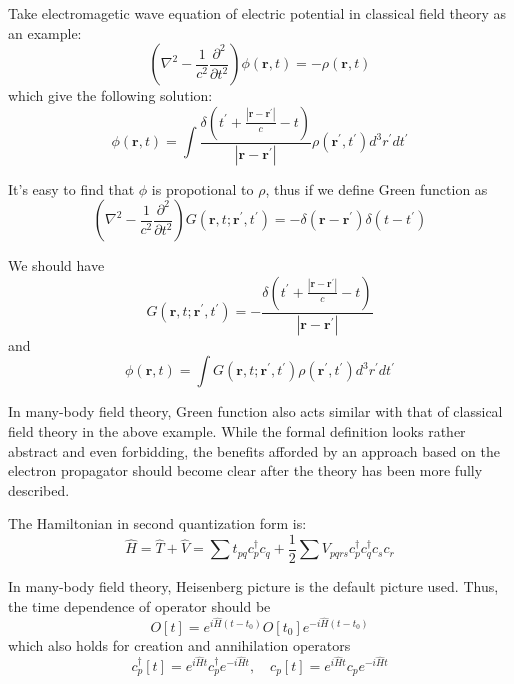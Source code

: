 Take electromagetic wave equation of electric potential in classical field theory as an example:
\begin{equation}
\left(\nabla^{2}-\frac{1}{c^2}\frac{\partial^{2}}{\partial t^{2}}\right) \phi(\mathbf{r},t)=-\rho(\mathbf{r},t)
\end{equation}
which give the following solution:
\begin{equation}
\phi(\mathbf{r}, t)=\int \frac{\delta\left(t^{\prime}+\frac{\left|\mathbf{r}-\mathbf{r}^{\prime}\right|}{c}-t\right)}{\left|\mathbf{r}-\mathbf{r}^{\prime}\right|} \rho\left(\mathbf{r}^{\prime}, t^{\prime}\right) d^{3} r^{\prime} d t^{\prime}
\end{equation}

It's easy to find that $\phi$ is propotional to $\rho$, thus if we define Green function as
\begin{equation}
\left(\nabla^{2}-\frac{1}{c^2}\frac{\partial^{2}}{\partial t^{2}}\right) G(\mathbf{r},t;\mathbf{r^{\prime}},t^{\prime})=-\delta(\mathbf{r}-\mathbf{r^\prime})\delta(t-t^{\prime})
\end{equation}

We should have
\begin{equation}
G(\mathbf{r},t;\mathbf{r^{\prime}},t^{\prime})=
-\frac{\delta\left(t^{\prime}+\frac{\left|\mathbf{r}-\mathbf{r}^{\prime}\right|}{c}-t\right)}{\left|\mathbf{r}-\mathbf{r}^{\prime}\right|}
\end{equation}
and
\begin{equation}
\phi(\mathbf{r}, t)=
\int G(\mathbf{r},t;\mathbf{r^{\prime}},t^{\prime}) \rho\left(\mathbf{r}^{\prime}, t^{\prime}\right) d^{3} r^{\prime} d t^{\prime}
\end{equation}

In many-body field theory, Green function also acts similar with that of classical field theory in the above example.
While the formal definition looks rather abstract and even forbidding, the benefits afforded by an approach based on the electron propagator should become clear after the theory has been more fully described.

The Hamiltonian in second quantization form is:
\begin{equation}
\hat{H}=\hat{T}+\hat{V}=\sum t_{p q} c_{p}^{\dagger} c_{q}+\frac{1}{2} \sum V_{p q r s} c_{p}^{\dagger} c_{q}^{\dagger} c_{s} c_{r}
\end{equation}

In many-body field theory, Heisenberg picture is the default picture used.
Thus, the time dependence of operator should be
\begin{equation}
O[t]=e^{i \hat{H} (t-t_0)} O[t_0] e^{-i \hat{H} (t-t_0)}
\end{equation}
which also holds for creation and annihilation operators
\begin{equation}
c_{p}^{\dagger}[t]=e^{i \hat{H} t} c_{p}^{\dagger} e^{-i \hat{H} t}, \quad c_{p}[t]=e^{i \hat{H} t} c_{p} e^{-i \hat{H} t}
\end{equation}


